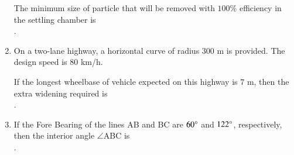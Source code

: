 \documentclass[journal,12pt,onecolumn]{article}
\theoremstyle{remark}
\begin{document}
\begin{enumerate}
    The minimum size of particle that will be removed with $100$\% efficiency in the settling chamber  is \underline{\hspace{2cm}} \\ .
    
    \hfill{}
    
    \item On a two-lane highway, a horizontal curve of radius $300$ m is provided. The design speed is $80$ km/h.
    
    If the longest wheelbase of vehicle expected on this highway is $7$ m, then the extra widening required  is \underline{\hspace{2cm}} \\ .
    
    \hfill{}
    
    \item If the Fore Bearing of the lines AB and BC are $60\degree$ and $122\degree$, respectively, then the interior angle $\angle$ABC  is \underline{\hspace{2cm}} \\ .
    
    \hfill{}
    
\end{enumerate}
\end{document}
